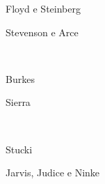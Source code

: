 \begin{subfigure}{0.30\textwidth}
    \centering
    
    \caption{Floyd e Steinberg}
\end{subfigure}%
\begin{subfigure}{0.63\textwidth}
    \centering
    
    \caption{Stevenson e Arce}
\end{subfigure}\\[8pt]
\begin{subfigure}{0.48\textwidth}
    \centering
    
    \caption{Burkes}
\end{subfigure}%
\begin{subfigure}{0.48\textwidth}
    \centering
    
    \caption{Sierra}
\end{subfigure}\\[8pt]
\begin{subfigure}{0.48\textwidth}
    \centering
    
    \caption{Stucki}
\end{subfigure}%
\begin{subfigure}{0.48\textwidth}
    \centering
    
    \caption{Jarvis, Judice e Ninke}
\end{subfigure}